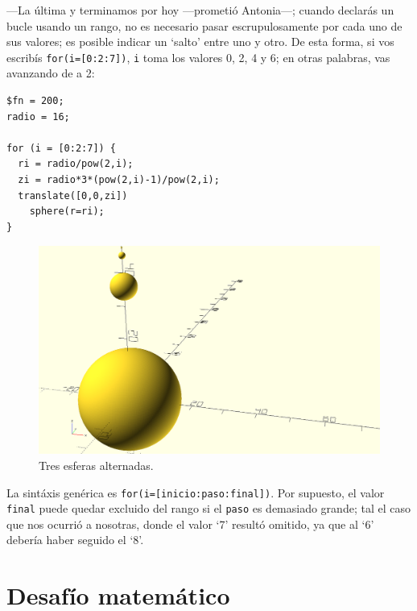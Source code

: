     ---La última y terminamos por hoy ---prometió An\-to\-nia---;
    cuando declarás un bucle usando un rango, no es necesario pasar
    escrupulosamente por cada uno de sus valores; es posible indicar
    un `salto' entre uno y otro. De esta forma, si vos escribís
    \lstinline!for(i=[0:2:7])!, \texttt{i} toma los valores 0, 2, 4 y
    6; en otras palabras, vas avanzando de a 2:


    \begin{lstlisting}
$fn = 200;
radio = 16;

for (i = [0:2:7]) {
  ri = radio/pow(2,i);
  zi = radio*3*(pow(2,i)-1)/pow(2,i);
  translate([0,0,zi])
    sphere(r=ri);
}

\end{lstlisting} %


\begin{figure}[ht]
  \centering
  \includegraphics[width=.75\textwidth]{imagenes/esferas-alternadas}  
  \caption{Tres esferas alternadas.}
  \label{fig:esferas-alternadas}
\end{figure}

\guillemotright La sintáxis genérica es \lstinline!for(i=[inicio:paso:final])!. Por supuesto, el valor \texttt{final} puede
quedar excluido del rango si el \texttt{paso} es demasiado grande; tal
el caso que nos ocurrió a nosotras, donde el valor `7' resultó
omitido, ya que al `6' debería haber seguido el `8'.

\section{Desafío matemático}

